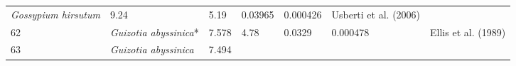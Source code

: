 \documentclass[]{article}
\begin{document}
\begin{longtable}[]{@{}lllllll@{}}
\begin{minipage}[t]{0.23\columnwidth}
\emph{Gossypium hirsutum}\strut
\end{minipage} & \begin{minipage}[t]{0.05\columnwidth}\raggedright
9.24\strut
\end{minipage} & \begin{minipage}[t]{0.08\columnwidth}\raggedright
5.19\strut
\end{minipage} & \begin{minipage}[t]{0.08\columnwidth}\raggedright
0.03965\strut
\end{minipage} & \begin{minipage}[t]{0.08\columnwidth}\raggedright
0.000426\strut
\end{minipage} & \begin{minipage}[t]{0.23\columnwidth}\raggedright
Usberti et al. (2006)\strut
\end{minipage}\tabularnewline
\begin{minipage}[t]{0.05\columnwidth}\raggedright
62\strut
\end{minipage} & \begin{minipage}[t]{0.23\columnwidth}\raggedright
\emph{Guizotia abyssinica}*\strut
\end{minipage} & \begin{minipage}[t]{0.05\columnwidth}\raggedright
7.578\strut
\end{minipage} & \begin{minipage}[t]{0.08\columnwidth}\raggedright
4.78\strut
\end{minipage} & \begin{minipage}[t]{0.08\columnwidth}\raggedright
0.0329\strut
\end{minipage} & \begin{minipage}[t]{0.08\columnwidth}\raggedright
0.000478\strut
\end{minipage} & \begin{minipage}[t]{0.23\columnwidth}\raggedright
Ellis et al. (1989)\strut
\end{minipage}\tabularnewline
\begin{minipage}[t]{0.05\columnwidth}\raggedright
63\strut
\end{minipage} & \begin{minipage}[t]{0.23\columnwidth}\raggedright
\emph{Guizotia abyssinica}\strut
\end{minipage} & \begin{minipage}[t]{0.05\columnwidth}\raggedright
7.494\strut
\end{minipage} & \begin{minipage}[t]{0.08\columnwidth}\raggedright

\end{minipage}
\end{longtable}
\end{document}
